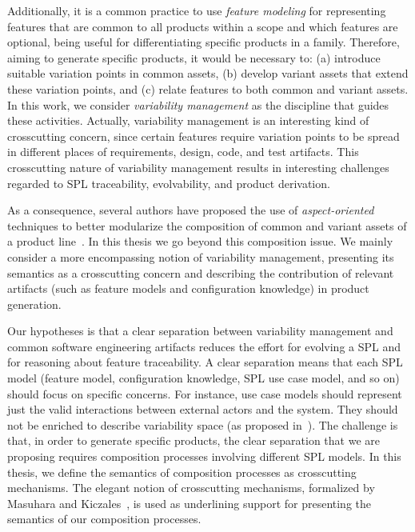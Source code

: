 \documentclass[times, 11pt,twocolumn]{article}
\begin{document}
Additionally, it is a common practice to use \emph{feature modeling} for
representing features that are common to all products within a scope and which
features are optional, being useful for differentiating specific products in a
family. Therefore, aiming to generate specific products, it would be necessary
to: (a) introduce suitable variation points in common assets, (b) develop variant
assets that extend these variation points, and (c) relate features to both common
and variant assets.  In this work, we consider \emph{variability management} as
the discipline that guides these activities. Actually, variability management is
an interesting kind of crosscutting concern, since certain features require
variation points to be spread in different places of requirements, design, code,
and test artifacts. This crosscutting nature of variability management results in
interesting challenges regarded to SPL traceability, evolvability, and product
derivation. 

As a consequence, several authors have proposed the use of
\emph{aspect-oriented} techniques to better modularize the composition of common
and variant assets of a product
line~\cite{Figueiredo:2008aa,Alves:2006aa,Apel:2006aa}. In this thesis we go
beyond this composition issue. We mainly consider a more encompassing notion of
variability management, presenting its semantics as a crosscutting concern and
describing the contribution of relevant artifacts (such as feature models and
configuration knowledge) in product generation.


Our hypotheses is that a clear separation between variability management and
common software engineering artifacts reduces the effort for
evolving a SPL and for reasoning about feature traceability. A
clear separation means that each SPL model (feature model, configuration knowledge, SPL use case model, and so on) should focus on specific concerns. For instance, use case models should represent just the valid interactions between external actors and the system. They should not be enriched
to describe variability space (as proposed in~\cite{Bertolino:2003aa}). The challenge is that, in order
to generate specific products, the clear separation that we are proposing
requires composition processes involving different SPL models. In this thesis,
we define the semantics of composition processes as crosscutting mechanisms.
The elegant notion of crosscutting mechanisms, formalized by Masuhara and
Kiczales~\cite{Masuhara:2003aa}, is used as underlining support for presenting
the semantics of our composition processes. 
\end{document}
